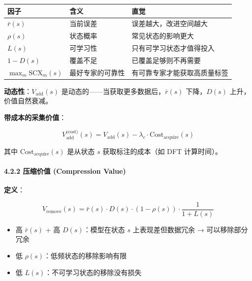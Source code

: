 \documentclass[
  12pt,
]{ctexart}
\providecommand{\tightlist}{%
  \setlength{\itemsep}{0pt}\setlength{\parskip}{0pt}}
\begin{document}
\begin{longtable}[]{@{}
  >{\raggedright\arraybackslash}p{}
  >{\raggedright\arraybackslash}p{}
  >{\raggedright\arraybackslash}p{}@{}}
\toprule\noalign{}
\begin{minipage}[b]{\linewidth}\raggedright
因子
\end{minipage} & \begin{minipage}[b]{\linewidth}\raggedright
含义
\end{minipage} & \begin{minipage}[b]{\linewidth}\raggedright
直觉
\end{minipage} \\
\midrule\noalign{}
\endhead
\bottomrule\noalign{}
\endlastfoot
\(\bar{r}(s)\) & 当前误差 & 误差越大，改进空间越大 \\
\(\rho(s)\) & 状态概率 & 常见状态的影响更大 \\
\(L(s)\) & 可学习性 & 只有可学习状态才值得投入 \\
\(1 - D(s)\) & 覆盖不足 & 已覆盖足够则不再需要 \\
\(\max_m \text{SCX}_m(s)\) & 最好专家的可靠性 &
有可靠专家才能获取高质量标签 \\
\end{longtable}

\textbf{动态性}：\(V_{\text{add}}(s)\)
是动态的------当获取更多数据后，\(\bar{r}(s)\) 下降，\(D(s)\)
上升，价值自然衰减。

\textbf{带成本的采集价值}：

\[
V_{\text{add}}^{\text{(cost)}}(s) = V_{\text{add}}(s) - \lambda_c \cdot \text{Cost}_{\text{acquire}}(s)
\]

其中 \(\text{Cost}_{\text{acquire}}(s)\) 是从状态 \(s\)
获取标注的成本（如 DFT 计算时间）。

\paragraph{4.2.2 压缩价值 (Compression
Value)}\label{ux538bux7f29ux4ef7ux503c-compression-value}

\textbf{定义}：

\[
V_{\text{remove}}(s) = \bar{r}(s) \cdot D(s) \cdot (1 - \rho(s)) \cdot \frac{1}{1 + L(s)}
\]

\begin{itemize}
\tightlist
\item
  高 \(\bar{r}(s)\) + 高 \(D(s)\)：模型在状态 \(s\) 上表现差但数据冗余 →
  可以移除部分冗余
\item
  低 \(\rho(s)\)：低频状态的移除影响有限
\item
  低 \(L(s)\)：不可学习状态的移除没有损失
\end{itemize}
\end{document}
